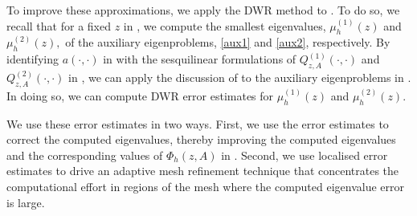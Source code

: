 
To improve these approximations, we apply the DWR method to .  To do so, we recall that for a fixed $z$ in , we compute the smallest eigenvalues, $\mu_h^{(1)}(z)$ and $\mu_h^{(2)}(z),$ of the auxiliary eigenproblems, \eqref{aux1} and \eqref{aux2}, respectively. By identifying $a(\cdot, \cdot)$ in  with the sesquilinear formulations of $Q_{z, A}^{(1)}(\cdot, \cdot)$ and $Q_{z, A}^{(2)}(\cdot, \cdot)$ in , we can apply the discussion of  to the auxiliary eigenproblems in . In doing so, we can compute DWR error estimates for $\mu_h^{(1)}(z)$ and $\mu_h^{(2)}(z)$.




We use these error estimates in two ways. First, we use the error estimates to correct the computed eigenvalues, thereby improving the computed eigenvalues and the corresponding values of $\Phi_h(z, A)$ in .
Second, we use localised error estimates to drive an adaptive mesh refinement technique that concentrates the computational effort in regions of the mesh where the computed eigenvalue error is large. 

